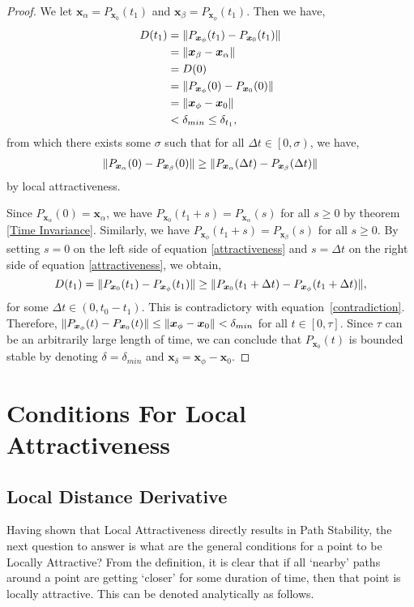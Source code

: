 \documentclass{article}
\newcommand{\B}[1]{\boldsymbol{#1}}
\DeclarePairedDelimiter\norm{\lVert}{\rVert}%
\theoremstyle{definition}
\theoremstyle{remark}
\begin{document}
\begin{proof}
  We let $\B{x}_\alpha = P_{\B{x}_0}(t_1)$ and $\B{x}_\beta = P_{\B{x}_\phi}(t_1)$. Then we have,
  \begin{align}
  D(t_1) &= \norm{P_{\B{x}_\phi}(t_1)-P_{\B{x}_0}(t_1)} \nonumber\\
  &= \norm{\B{x}_\beta - \B{x}_\alpha} \nonumber\\
  &= D(0) \nonumber\\
  & = \norm{P_{\B{x}_\phi}(0)-P_{\B{x}_0}(0)} \nonumber\\
  &= \norm{\B{x}_\phi - \B{x}_0} \nonumber\\
  &< \delta_{min} \leq \delta_{t_1},
  \end{align}
  from which there exists some $\sigma$ such that for all $\Delta t \in \left[0, \sigma\right)$, we have,
  \begin{align}
  \norm{P_{\B{x}_\alpha}(0) - P_{\B{x}_\beta}(0)} \ge \norm{P_{\B{x}_\alpha}(\Delta t) - P_{\B{x}_{\beta}}(\Delta t)} \label{attractiveness}
  \end{align}
  by local attractiveness.
      
  Since $P_{\B{x}_\alpha}(0) = \B{x}_\alpha$, we have $P_{\B{x}_0}(t_1 + s) = P_{\B{x}_\alpha}(s)$   for all $s \geq 0$ by theorem \ref{Time Invariance}. Similarly, we have $P_{\B{x}_\phi}(t_1 + s) = P_{\B{x}_\beta}(s)$ for all $s \geq 0$. By setting $s=0$ on the left side 
  of equation \ref{attractiveness} and $s=\Delta t$ on the right side of equation \ref{attractiveness}, we obtain,
  $$
  D(t_1) = \norm{P_{\B{x}_0}(t_1) - P_{\B{x}_\phi}(t_1)} \geq \norm{P_{\B{x}_0}(t_1 + \Delta t) - P_{\B{x}_\phi}(t_1 + \Delta t)},
  $$
  for some $\Delta t \in \left(0, t_0 - t_1\right)$. This is contradictory with equation~\ref{contradiction}.  
  Therefore, $\norm{P_{\B{x}_\phi}(t)-P_{\B{x}_0}(t)} \leq \norm{\B{x}_\phi - \B{x}_0} < \delta_{min}$ for all
  $t \in [0, \tau]$. Since $\tau$ can be an arbitrarily large length of time, we can conclude that $P_{\B{x}_0}(t)$ is bounded stable by denoting
  $\delta=\delta_{min}$ and $\B{x}_\delta=\B{x}_\phi - \B{x}_0$.
\end{proof}

\section{Conditions For Local Attractiveness}
\subsection{Local Distance Derivative}
Having shown that Local Attractiveness directly results in Path Stability, the 
next question to answer is what are the general conditions for a point to be Locally Attractive?
From the definition, it is clear that if all `nearby' paths around a point are getting `closer'
for some duration of time, then that point is locally attractive. This can be denoted analytically as follows.
\end{document}
